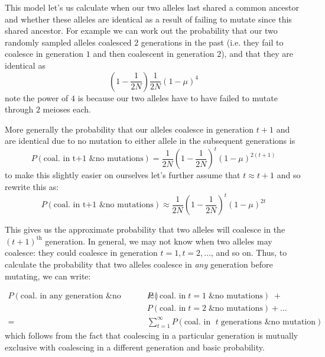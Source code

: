 This model let's us calculate when our two alleles last shared a common
ancestor and whether these alleles are identical as a result of
failing to mutate since this shared ancestor.  For example we can work out the probability that our
two randomly sampled alleles coalesced $2$ generations in the past
(i.e. they fail to coalesce in generation $1$ and then coalescent in
generation $2$), and
that they are identical as
\begin{equation}
\left(1- \frac{1}{2N} \right) \frac{1}{2N} (1-\mu)^4
\end{equation}
note the power of $4$ is because our two alleles have to have failed
to mutate through $2$ meioses each. 

More generally the probability that our alleles coalesce in generation
$t+1$ and are identical due to no mutation to either allele in the
subsequent generations is
%
\begin{equation}
P(\textrm{coal. in t+1 \& no mutations}) =  \frac{1}{2N} \left(1- \frac{1}{2N} \right)^t \left(1-\mu \right)^{2(t+1)}
\end{equation}
%
to make this slightly easier on ourselves let's further assume that $t
\approx t+1$ and so rewrite this as:
\begin{equation}
P(\textrm{coal. in t+1 \& no mutations}) \approx \frac{1}{2N} \left(1- \frac{1}{2N} \right)^t \left(1-\mu \right)^{2t}
\end{equation}
%

This gives us the approximate probability that two alleles will coalesce in the
$(t+1)^\text{th}$ generation. In general, we may not know when two alleles may
coalesce: they could coalesce in generation $t=1, t=2, \ldots $, and so on.
Thus, to calculate the probability that two alleles coalesce in \emph{any}
generation before mutating, we can write:

\begin{align*}
  P(\textrm{coal. in any generation \& no mutations}) \approx & P(\textrm{coal. in} \; t=1 \; \textrm{\& no mutations}) \; + \\ 
&  P(\textrm{coal. in} \; t=2 \; \textrm{\& no mutations}) + \ldots \\
  = & \sum_{t=1}^\infty P(\textrm{coal. in } \; t \; \textrm{generations \& no mutation})
\end{align*}
%
which follows from the fact that coalescing in a particular generation is
mutually exclusive with coalescing in a different generation and basic probability.

